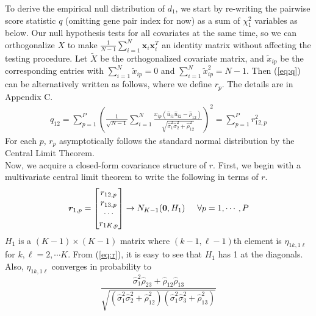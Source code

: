 \documentclass[aoas,authoryear, preprint]{imsart}
\numberwithin{equation}{section}
\theoremstyle{plain}
\begin{document}
To derive the empirical null distribution of $d_1$, we start by re-writing the pairwise score statistic $q$ (omitting gene pair index for now) as a sum of $\chi_1^2$ variables as below. Our null hypothesis tests for all covariates at the same time, so we can orthogonalize $X$ to make $\frac{1}{N-1} \sum_{i=1}^{N} \bm{x}_i \bm{x}_i^T$ an identity matrix without affecting the testing procedure. Let $\tilde{X}$ be the orthogonalized covariate matrix, and $\tilde{x}_{ip}$ be the corresponding entries with $\sum_{i=1}^{N}\tilde{x}_{ip} = 0$ and $\sum_{i=1}^{N} \tilde{x}_{ip}^2  = N-1$. Then (\ref{eq:q}) can be alternatively written as follows, where we define $r_{p}.$ The details are in Appendix C. 
\begin{align}
q_{12} = \sum_{p=1}^{P}
 \left(\frac{1}{\sqrt{N-1}}
 \sum_{i=1}^{N} \frac{x_{ip} \left(\hat{u}_{i1}\hat{u}_{i2} - \hat{\rho}_{12} \right)}{\sqrt{\hat{\sigma}_{1}^2\hat{\sigma}_{2}^2 + \hat{\rho}_{12}^2}}
\right)^2 = \sum_{p=1}^{P}r_{12,p}^2
\label{eq:r}
\end{align}
For each $p$, $r_p$ asymptotically follows the standard normal distribution by the Central Limit Theorem. \\

Now, we acquire a closed-form covariance structure of $r$. First, we begin with a multivariate central limit theorem to write the following in terms of $r$.
\begin{equation}
\bm{r}_{1,p} = \begin{bmatrix}
r_{12,p} \\ r_{13, p} \\ \cdots \\ r_{1K,p}
\end{bmatrix}  \rightarrow N_{K-1}(\bm{0}, H_1) \hspace{5mm} \forall p = 1, \cdots, P
\label{eq:H}
\end{equation}
$H_1$ is a $(K-1) \times (K-1)$ matrix where $(k-1, \ell-1)$th element is $\eta_{1k, 1\ell}$ for $k, \ell = 2, \cdots K$. From (\ref{eq:r}), it is easy to see that $H_1$ has 1 at the diagonals. Also, $\eta_{1k, 1\ell}$ converges in probability to
\begin{equation}
\frac{\hat{\sigma}_1^2\hat{\rho}_{23} + \hat{\rho}_{12}\hat{\rho}_{13}}{
\sqrt{(\hat{\sigma}_1^2\hat{\sigma}_2^2 + \hat{\rho}_{12}^2)(\hat{\sigma}_1^2\hat{\sigma}_3^2 + \hat{\rho}_{13}^2)}}
\label{eq:eta}\end{equation}
\end{document}
